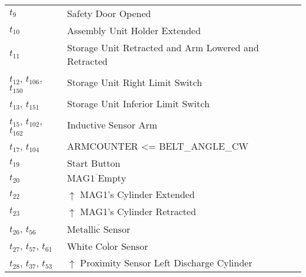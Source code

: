 \begin{longtable}{M{5cm}M{10cm}}
\hyperlink{completeNet:t9}{\hypertarget{completeTable:t9}{$t_{9}$}} & Safety Door Opened\\
\hyperlink{completeNet:t10}{\hypertarget{completeTable:t10}{$t_{10}$}} & Assembly Unit Holder Extended\\
\hyperlink{completeNet:t11}{\hypertarget{completeTable:t11}{$t_{11}$}} & Storage Unit Retracted and Arm Lowered and Retracted\\
\hyperlink{completeNet:t12}{\hypertarget{completeTable:t12}{$t_{12}$}}, \hyperlink{completeNet:t106}{\hypertarget{completeTable:t106}{$t_{106}$}}, \hyperlink{completeNet:t150}{\hypertarget{completeTable:t150}{$t_{150}$}} & Storage Unit Right Limit Switch\\
\hyperlink{completeNet:t13}{\hypertarget{completeTable:t13}{$t_{13}$}}, \hyperlink{completeNet:t151}{\hypertarget{completeTable:t151}{$t_{151}$}} & Storage Unit Inferior Limit Switch\\
\hyperlink{completeNet:t15}{\hypertarget{completeTable:t15}{$t_{15}$}}, \hyperlink{completeNet:t102}{\hypertarget{completeTable:t102}{$t_{102}$}}, \hyperlink{completeNet:t162}{\hypertarget{completeTable:t162}{$t_{162}$}} & Inductive Sensor Arm\\
\hyperlink{completeNet:t17}{\hypertarget{completeTable:t17}{$t_{17}$}}, \hyperlink{completeNet:t104}{\hypertarget{completeTable:t104}{$t_{104}$}} & ARMCOUNTER <= BELT\_ANGLE\_CW\\
\hyperlink{completeNet:t19}{\hypertarget{completeTable:t19}{$t_{19}$}} & Start Button\\
\hyperlink{completeNet:t20}{\hypertarget{completeTable:t20}{$t_{20}$}} & \(\overline{\mbox{MAG1 Empty}}\)\\
\hyperlink{completeNet:t22}{\hypertarget{completeTable:t22}{$t_{22}$}} & \(\uparrow\) MAG1's Cylinder Extended\\
\hyperlink{completeNet:t23}{\hypertarget{completeTable:t23}{$t_{23}$}} & \(\uparrow\) MAG1's Cylinder Retracted\\
\hyperlink{completeNet:t26}{\hypertarget{completeTable:t26}{$t_{26}$}}, \hyperlink{completeNet:t56}{\hypertarget{completeTable:t56}{$t_{56}$}} & \(\overline{\mbox{Metallic Sensor}}\)\\
\hyperlink{completeNet:t27}{\hypertarget{completeTable:t27}{$t_{27}$}}, \hyperlink{completeNet:t57}{\hypertarget{completeTable:t57}{$t_{57}$}}, \hyperlink{completeNet:t61}{\hypertarget{completeTable:t61}{$t_{61}$}} & \(\overline{\mbox{White Color Sensor}}\)\\
\hyperlink{completeNet:t28}{\hypertarget{completeTable:t28}{$t_{28}$}}, \hyperlink{completeNet:t37}{\hypertarget{completeTable:t37}{$t_{37}$}}, \hyperlink{completeNet:t53}{\hypertarget{completeTable:t53}{$t_{53}$}} & \(\uparrow\) Proximity Sensor Left Discharge Cylinder\\

\end{longtable}
